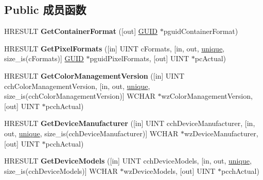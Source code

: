 \subsection*{Public 成员函数}
\begin{DoxyCompactItemize}
\item 
\mbox{\label{interface_i_w_i_c_bitmap_codec_info_a55de8fe390c6b4f0cfdf475e9bee3ef3}} 
H\+R\+E\+S\+U\+LT {\bfseries Get\+Container\+Format} (\mbox{[}out\mbox{]} \hyperlink{interface_g_u_i_d}{G\+U\+ID} $\ast$pguid\+Container\+Format)
\item 
\mbox{\label{interface_i_w_i_c_bitmap_codec_info_a2b1e882e52da5f828e863641a9c5ac70}} 
H\+R\+E\+S\+U\+LT {\bfseries Get\+Pixel\+Formats} (\mbox{[}in\mbox{]} U\+I\+NT c\+Formats, \mbox{[}in, out, \hyperlink{interfaceunique}{unique}, size\+\_\+is(c\+Formats)\mbox{]} \hyperlink{interface_g_u_i_d}{G\+U\+ID} $\ast$pguid\+Pixel\+Formats, \mbox{[}out\mbox{]} U\+I\+NT $\ast$pc\+Actual)
\item 
\mbox{\label{interface_i_w_i_c_bitmap_codec_info_a07edc157bfd2ede52a162d4d2599744c}} 
H\+R\+E\+S\+U\+LT {\bfseries Get\+Color\+Management\+Version} (\mbox{[}in\mbox{]} U\+I\+NT cch\+Color\+Management\+Version, \mbox{[}in, out, \hyperlink{interfaceunique}{unique}, size\+\_\+is(cch\+Color\+Management\+Version)\mbox{]} W\+C\+H\+AR $\ast$wz\+Color\+Management\+Version, \mbox{[}out\mbox{]} U\+I\+NT $\ast$pcch\+Actual)
\item 
\mbox{\label{interface_i_w_i_c_bitmap_codec_info_a47f8bb991826db6bf20b820cb3aa629c}} 
H\+R\+E\+S\+U\+LT {\bfseries Get\+Device\+Manufacturer} (\mbox{[}in\mbox{]} U\+I\+NT cch\+Device\+Manufacturer, \mbox{[}in, out, \hyperlink{interfaceunique}{unique}, size\+\_\+is(cch\+Device\+Manufacturer)\mbox{]} W\+C\+H\+AR $\ast$wz\+Device\+Manufacturer, \mbox{[}out\mbox{]} U\+I\+NT $\ast$pcch\+Actual)
\item 
\mbox{\label{interface_i_w_i_c_bitmap_codec_info_a2915e522fdfd02715ee7e6883d3eb385}} 
H\+R\+E\+S\+U\+LT {\bfseries Get\+Device\+Models} (\mbox{[}in\mbox{]} U\+I\+NT cch\+Device\+Models, \mbox{[}in, out, \hyperlink{interfaceunique}{unique}, size\+\_\+is(cch\+Device\+Models)\mbox{]} W\+C\+H\+AR $\ast$wz\+Device\+Models, \mbox{[}out\mbox{]} U\+I\+NT $\ast$pcch\+Actual)

\end{DoxyCompactItemize}
